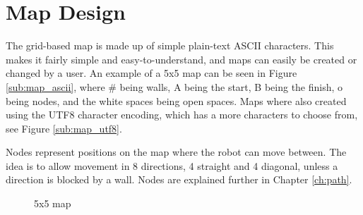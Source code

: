 \section{Map Design}
\label{sec:map_design} %
The grid-based map is made up of simple plain-text ASCII characters. 
This makes it fairly simple and easy-to-understand, and maps can easily be created or changed by a user. An example of a 5x5 map can be seen in Figure \ref{sub:map_ascii}, where \# being walls, A being the start, B being the finish, o being nodes, and the white spaces being open spaces. Maps where also created using the UTF8 character encoding, which has a more characters to choose from, see Figure \ref{sub:map_utf8}.

Nodes represent positions on the map where the robot can move between. The idea is to allow movement in 8 directions, 4 straight and 4 diagonal, unless a direction is blocked by a wall. Nodes are explained further in Chapter \ref{ch:path}.


\begin{figure}[htp]
    \centering
    \hspace{0.2\textwidth}
    \caption{5x5 map}
    \label{fig:5x5map}
\end{figure}

